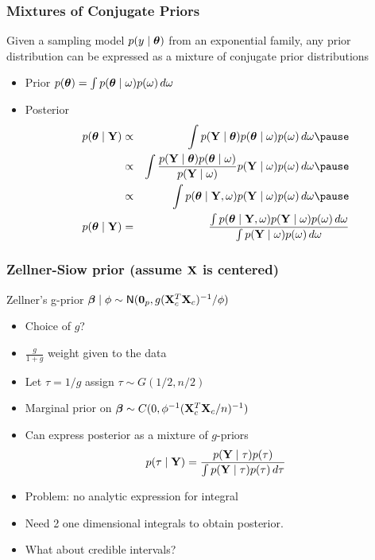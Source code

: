 \documentclass[handout]{beamer}\usepackage[]{graphicx}\usepackage[]{color}
\begin{document}
\begin{frame}
  \frametitle{Mixtures of Conjugate Priors}
  \begin{theorem}  Given a sampling model
  $p(y \mid \boldsymbol{\theta})$ from an exponential family, any prior distribution
  can be expressed as a mixture of conjugate prior distributions
 \end{theorem}

 \begin{itemize}
 \item Prior $p(\boldsymbol{\theta}) = \int p(\boldsymbol{\theta} \mid \omega) p(\omega)\, d \omega$ \pause
 \item Posterior \pause
   \begin{eqnarray*}
   p(\tb \mid \Y)  &\propto & \int p(\Y \mid \tb) p(\tb\mid \omega)
   p(\omega) \, d\omega \pause \\
 & \propto & \int  \frac{  p(\Y \mid \tb) p(\tb \mid \omega) } {p(\Y \mid
   \omega)}  p(\Y \mid
 \omega) p(\omega ) \, d \omega  \pause \\
& \propto & \int p(\tb \mid \Y, \omega)  p(\Y \mid
 \omega) p(\omega ) \, d \omega \pause \\
 p(\tb \mid \Y) & =  & \frac{\int p(\tb \mid \Y, \omega)  p(\Y \mid
 \omega) p(\omega ) \, d \omega }
{\int p(\Y \mid
 \omega) p(\omega ) \, d \omega }
       \end{eqnarray*}

 \end{itemize}
\end{frame}

\begin{frame}
  \frametitle{Zellner-Siow prior (assume $\mathbf{X}$ is centered)}
Zellner's g-prior $\boldsymbol{\beta} \mid \phi \sim \textsf{N}(\mathbf{0}_p, g
    (\mathbf{X}_c^T\mathbf{X}_c)^{-1}/\phi)$ \pause

\begin{itemize}
\item Choice of $g$?  \pause
\item $\frac{g}{1 + g}$  weight given to the data \pause
\item Let $\tau = 1/g$ assign $\tau \sim G(1/2, n/2)$ \pause
\item Marginal prior on $\boldsymbol{\beta} \sim C(0, \phi^{-1} (\mathbf{X}_c^T\mathbf{X}_c/n)^{-1})$
\item Can express posterior as a mixture of $g$-priors
$$p(\tau \mid \mathbf{Y}) = \frac{p(\mathbf{Y} \mid \tau) p(\tau)}{\int p(\mathbf{Y} \mid \tau) p(\tau) \, d \tau}$$ \pause
\item Problem:  no analytic expression for integral \pause
\item Need 2 one dimensional integrals to obtain posterior. \pause
\item What about credible intervals?
\end{itemize}
\end{frame}
\end{document}
